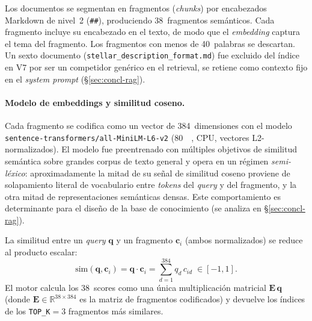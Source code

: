 Los documentos se segmentan en fragmentos (\emph{chunks}) por encabezados
Markdown de nivel~2 (\verb|##|), produciendo \num{38}~fragmentos semánticos.
Cada fragmento incluye su encabezado en el texto, de modo que el \emph{embedding}
captura el tema del fragmento. Los fragmentos con menos de \num{40}~palabras se
descartan. Un sexto documento (\texttt{stellar\_description\_format.md}) fue
excluido del índice en V7 por ser un competidor genérico en el retrieval,
se retiene como contexto fijo en el \emph{system prompt} (§\ref{sec:concl-rag}).

\paragraph{Modelo de embeddings y similitud coseno.} Cada fragmento se codifica
como un vector de \num{384}~dimensiones con el modelo
\texttt{sentence-transformers/all-MiniLM-L6-v2} (\SI{80}{\mega\byte}, CPU, vectores
L2-normalizados). El modelo fue preentrenado con múltiples objetivos de similitud
semántica sobre grandes corpus de texto general y opera en un régimen
\emph{semi-léxico}: aproximadamente la mitad de su señal de similitud coseno
proviene de solapamiento literal de vocabulario entre \emph{tokens} del \emph{query}
y del fragmento, y la otra mitad de representaciones semánticas densas. Este
comportamiento es determinante para el diseño de la base de conocimiento (se
analiza en §\ref{sec:concl-rag}).

La similitud entre un \emph{query} $\mathbf{q}$ y un fragmento $\mathbf{c}_i$
(ambos normalizados) se reduce al producto escalar:
\begin{equation}
  \mathrm{sim}(\mathbf{q}, \mathbf{c}_i) =
    \mathbf{q} \cdot \mathbf{c}_i =
    \sum_{d=1}^{384} q_d\, c_{id} \;\in [-1, 1].
  \label{eq:cosine}
\end{equation}
El motor calcula los \num{38}~scores como una única multiplicación matricial
$\mathbf{E}\,\mathbf{q}$ (donde $\mathbf{E}\in\mathbb{R}^{38\times384}$ es la
matriz de fragmentos codificados) y devuelve los índices de los
\texttt{TOP\_K}$=3$ fragmentos más similares.

